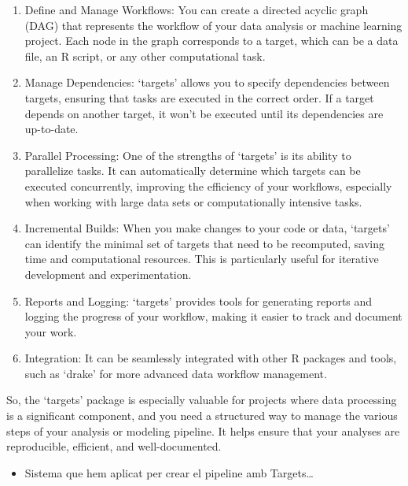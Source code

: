 \documentclass[a4paper, nobind]{templates/ociamthesis}
\providecommand{\tightlist}{%
  \setlength{\itemsep}{0pt}\setlength{\parskip}{0pt}}
\begin{document}
\begin{enumerate}
\def\labelenumi{\arabic{enumi}.}
\item
  Define and Manage Workflows: You can create a directed acyclic graph (DAG) that represents the workflow of your data analysis or machine learning project. Each node in the graph corresponds to a target, which can be a data file, an R script, or any other computational task.
\item
  Manage Dependencies: `targets' allows you to specify dependencies between targets, ensuring that tasks are executed in the correct order. If a target depends on another target, it won't be executed until its dependencies are up-to-date.
\item
  Parallel Processing: One of the strengths of `targets' is its ability to parallelize tasks. It can automatically determine which targets can be executed concurrently, improving the efficiency of your workflows, especially when working with large data sets or computationally intensive tasks.
\item
  Incremental Builds: When you make changes to your code or data, `targets' can identify the minimal set of targets that need to be recomputed, saving time and computational resources. This is particularly useful for iterative development and experimentation.
\item
  Reports and Logging: `targets' provides tools for generating reports and logging the progress of your workflow, making it easier to track and document your work.
\item
  Integration: It can be seamlessly integrated with other R packages and tools, such as `drake' for more advanced data workflow management.
\end{enumerate}

So, the `targets' package is especially valuable for projects where data processing is a significant component, and you need a structured way to manage the various steps of your analysis or modeling pipeline. It helps ensure that your analyses are reproducible, efficient, and well-documented.

\begin{itemize}
\tightlist
\item
  Sistema que hem aplicat per crear el pipeline amb Targets\ldots{}
\end{itemize}
\end{document}
